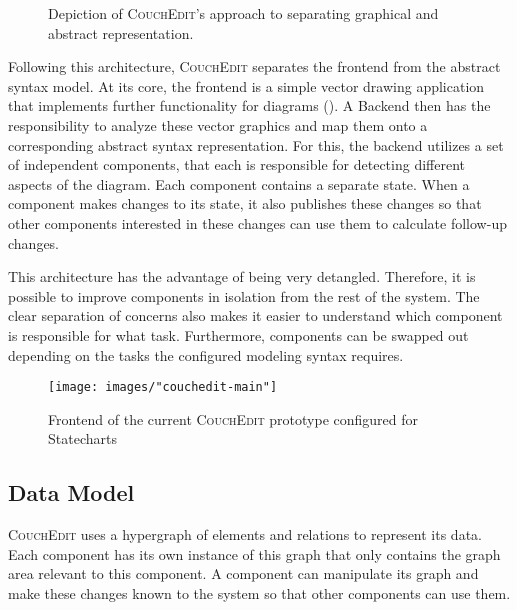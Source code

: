 \begin{figure}
  \centering
  
  \caption{Depiction of \textsc{CouchEdit}'s approach to separating graphical and abstract representation.}
  \label{fig:transmm}
  \end{figure}

Following this architecture, \textsc{CouchEdit} separates the frontend from the  abstract syntax model. At its core, the frontend is a simple vector drawing application that implements further functionality for diagrams (). A Backend then has the responsibility to analyze these vector graphics and map them onto a corresponding abstract syntax representation. For this, the backend utilizes a set of independent components, that each is responsible for detecting different aspects of the diagram. Each component contains a separate state. When a component makes changes to its state, it also publishes these changes so that other components interested in these changes can use them to calculate follow-up changes.  

This architecture has the advantage of being very detangled. Therefore, it is possible to improve components in isolation from the rest of the system. The clear separation of concerns also makes it easier to understand which component is responsible for what task. Furthermore, components can be swapped out depending on the tasks the configured modeling syntax requires.

\begin{figure}
\centering
\texttt{[image: images/"couchedit-main"]}
\caption{Frontend of the current \textsc{CouchEdit} prototype configured for Statecharts}
\label{fig:couchedit-main}
\end{figure}

\subsection{Data Model}
\textsc{CouchEdit} uses a hypergraph of elements and relations to represent its data. Each component has its own instance of this graph that only contains the graph area relevant to this component. A component can manipulate its graph and make these changes known to the system so that other components can use them.


